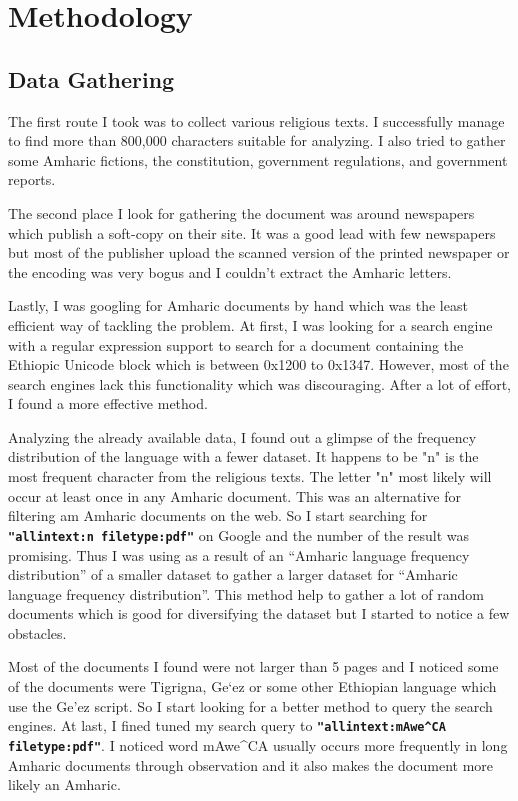 \section{Methodology}

\subsection{Data Gathering}
The first route I took was to collect various religious texts. I successfully manage to find more than 800,000 characters suitable for analyzing. I also tried to gather some Amharic fictions, the constitution, government regulations,  and government reports.

The second place I look for gathering the document was around newspapers which publish a soft-copy on their site. It was a good lead with few newspapers but most of the publisher upload the scanned version of the printed newspaper or the encoding was very bogus and I couldn't extract the Amharic letters.

Lastly, I was googling for Amharic documents by hand which was the least efficient way of tackling the problem. At first, I was looking for a search engine with a regular expression support to search for a document containing the Ethiopic Unicode block which is between 0x1200 to 0x1347. However, most of the search engines lack this functionality which was discouraging. After a lot of effort, I found a more effective method. 

Analyzing the already available data, I found out a glimpse of the frequency distribution of the language with a fewer dataset. It happens to be "\foreignlanguage{ethiop}{n}" is the most frequent character from the religious texts. The letter "\foreignlanguage{ethiop}{n}" most likely will occur at least once in any Amharic document. This was an alternative for filtering am Amharic documents on the web. So I start searching for \texttt{\textbf{"allintext:\foreignlanguage{ethiop}{n} filetype:pdf"}} on Google and the number of the result was promising. Thus I was using as a result of an “Amharic language frequency distribution” of a smaller dataset to gather a larger dataset for “Amharic language frequency distribution”. This method help to gather a lot of random documents which is good for diversifying the dataset but I started to notice a few obstacles.

Most of the documents I found were not larger than 5 pages and I noticed some of the documents were Tigrigna, Ge`ez or some other Ethiopian language which use the Ge’ez script. So I start looking for a better method to query the search engines. At last, I fined tuned my search query to \texttt{\textbf{"allintext:\foreignlanguage{ethiop}{mAwe^CA} filetype:pdf"}}. I noticed word \foreignlanguage{ethiop}{mAwe^CA} usually occurs more frequently in long Amharic documents through observation and it also makes the document more likely an Amharic.

